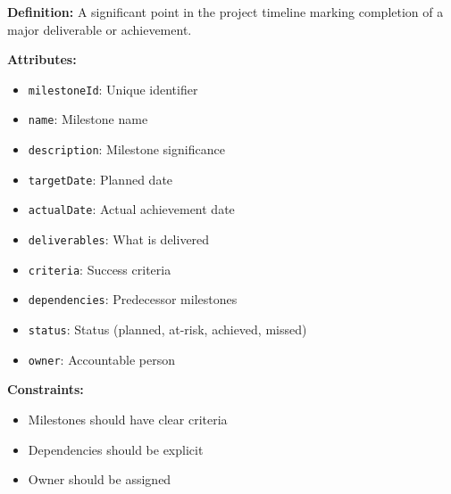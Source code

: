 \documentclass[11pt,letterpaper]{article}
\begin{document}
\begin{definitionbox}
\textbf{Definition:} A significant point in the project timeline marking completion of a major deliverable or achievement.

\textbf{Attributes:}
\begin{itemize}[nosep]
    \item \texttt{milestoneId}: Unique identifier
    \item \texttt{name}: Milestone name
    \item \texttt{description}: Milestone significance
    \item \texttt{targetDate}: Planned date
    \item \texttt{actualDate}: Actual achievement date
    \item \texttt{deliverables}: What is delivered
    \item \texttt{criteria}: Success criteria
    \item \texttt{dependencies}: Predecessor milestones
    \item \texttt{status}: Status (planned, at-risk, achieved, missed)
    \item \texttt{owner}: Accountable person
\end{itemize}

\textbf{Constraints:}
\begin{itemize}[nosep]
    \item Milestones should have clear criteria
    \item Dependencies should be explicit
    \item Owner should be assigned
\end{itemize}
\end{definitionbox}
\end{document}
